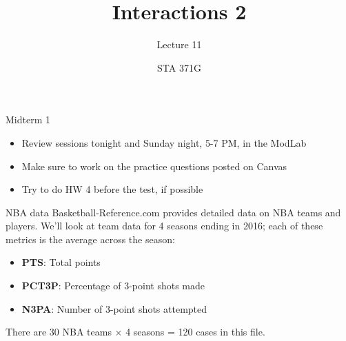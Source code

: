 \documentclass{beamer}\usepackage[]{graphicx}\usepackage[]{color}
\title{Interactions 2}
\subtitle{Lecture 11}
\author{STA 371G}
\begin{document}
  
  

  \frame{\maketitle}



  \begin{darkframes}
    \begin{frame}{Midterm 1}
      \begin{itemize}
        \item Review sessions tonight and Sunday night, 5-7 PM, in the ModLab
        \item Make sure to work on the practice questions posted on Canvas
        \item Try to do HW 4 before the test, if possible
      \end{itemize}
    \end{frame}

    \begin{frame}{NBA data}
      Basketball-Reference.com provides detailed data on NBA teams and players. We'll look at team data for 4 seasons ending in 2016; each of these metrics is the average across the season:
      \begin{itemize}
        \item \textbf{PTS}: Total points
        \item \textbf{PCT3P}: Percentage of 3-point shots made
        \item \textbf{N3PA}: Number of 3-point shots attempted
      \end{itemize}
      There are 30 NBA teams $\times$ 4 seasons = 120 cases in this file.
      \lc
    \end{frame}


\end{darkframes}
\end{document}
